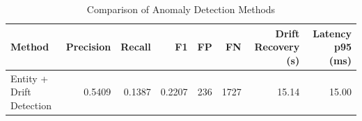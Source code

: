 \begin{table}[htbp]
\centering
\caption{Comparison of Anomaly Detection Methods}
\label{tab:comparison}
\begin{tabular}{lrrrrrrr}
\toprule
\textbf{Method} & \textbf{Precision} & \textbf{Recall} & \textbf{F1} & \textbf{FP} & \textbf{FN} & \textbf{Drift Recovery (s)} & \textbf{Latency p95 (ms)} \\
\midrule
Entity + Drift Detection & 0.5409 & 0.1387 & 0.2207 & 236 & 1727 & 15.14 & 15.00 \\
\bottomrule
\end{tabular}
\end{table}